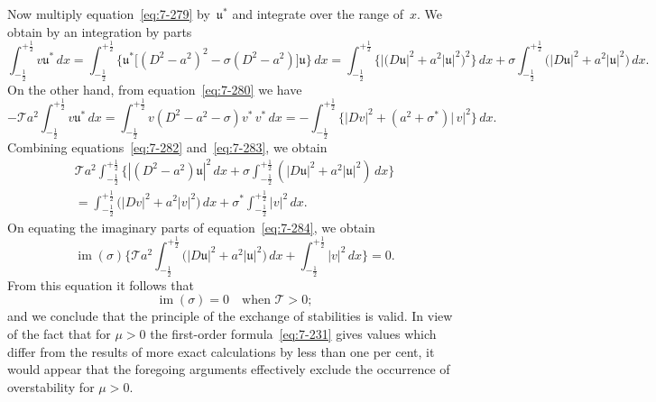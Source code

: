 Now multiply equation~\eqref{eq:7-279} by~$\mathfrak{u}^*$ and integrate over the range of~$x$.
We obtain by an integration by parts
\begin{equation}
\label{eq:7-282}
\int_{-\frac{1}{2}}^{+\frac{1}{2}} v\mathfrak{u}^*\,dx
= \int_{-\frac{1}{2}}^{+\frac{1}{2}}
  \bigl\{\mathfrak{u}^*\!\bigl[(D^2-a^2)^2 - \sigma(D^2-a^2)\bigr]\mathfrak{u}\bigr\}\,dx
= \int_{-\frac{1}{2}}^{+\frac{1}{2}}
  \bigl\{|(D\mathfrak{u}|^2+a^2|\mathfrak{u}|^2\bigr)^2\bigr\}\,dx
+ \sigma\!\int_{-\frac{1}{2}}^{+\frac{1}{2}}
  \bigl(|D\mathfrak{u}|^2+a^2|\mathfrak{u}|^2\bigr)\,dx.
\end{equation}
On the other hand, from equation~\eqref{eq:7-280} we have
\begin{equation}
\label{eq:7-283}
-\mathscr{T}a^2\!\int_{-\frac{1}{2}}^{+\frac{1}{2}} v\mathfrak{u}^*\,dx
= \int_{-\frac{1}{2}}^{+\frac{1}{2}}
  v(D^2-a^2-\sigma)v^*\,v^*\,dx
= -\int_{-\frac{1}{2}}^{+\frac{1}{2}}
  \bigl\{|Dv|^2+(a^2+\sigma^*)|\,v|^2\bigr\}\,dx.
\end{equation}
Combining equations~\eqref{eq:7-282} and~\eqref{eq:7-283}, we obtain
\begin{multline}
\label{eq:7-284}
\mathscr{T}a^2\!\int_{-\frac{1}{2}}^{+\frac{1}{2}}
  \bigl\{|(D^2-a^2)\mathfrak{u}|^2\,dx
  + \sigma\!\int_{-\frac{1}{2}}^{+\frac{1}{2}}
    (|D\mathfrak{u}|^2+a^2|\mathfrak{u}|^2)\,dx\bigr\} \\
= \int_{-\frac{1}{2}}^{+\frac{1}{2}}
  \bigl(|Dv|^2+a^2|v|^2\bigr)\,dx
  + \sigma^*\!\int_{-\frac{1}{2}}^{+\frac{1}{2}} |v|^2\,dx.
\end{multline}
On equating the imaginary parts of equation~\eqref{eq:7-284}, we obtain
\begin{equation}
\label{eq:7-285}
\operatorname{im}(\sigma)\!\Biggl\{
\mathscr{T}a^2\!\int_{-\frac{1}{2}}^{+\frac{1}{2}}
  \bigl(|D\mathfrak{u}|^2+a^2|\mathfrak{u}|^2\bigr)\,dx
  + \int_{-\frac{1}{2}}^{+\frac{1}{2}} |v|^2\,dx\Biggr\}
= 0.
\end{equation}
From this equation it follows that
\begin{equation}
\label{eq:7-286}
\operatorname{im}(\sigma) = 0 \quad \text{when } \mathscr{T} > 0;
\end{equation}
and we conclude that the principle of the exchange of stabilities is valid.
In view of the fact that for $\mu > 0$ the first-order formula~\eqref{eq:7-231} gives
values which differ from the results of more exact calculations by less
than one per cent, it would appear that the foregoing arguments effectively exclude the occurrence of overstability for $\mu > 0$.

